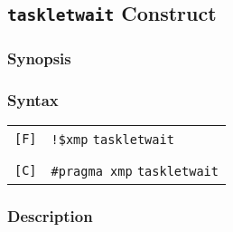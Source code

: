 



\subsection{{\tt taskletwait} Construct}

\subsubsection*{Synopsis}


\subsubsection*{Syntax}

\begin{tabular}{ll}
\verb![F]! & \verb|!$xmp| {\tt taskletwait} \\
& \\
\verb![C]! & \verb|#pragma xmp| {\tt taskletwait} \\
\end{tabular}

\subsubsection*{Description}




